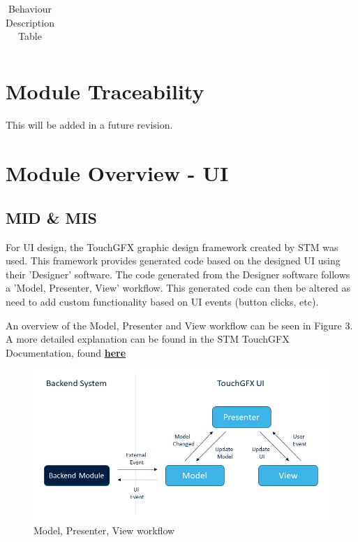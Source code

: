 \documentclass[12pt,titlepage]{article}
\begin{document}
\begin{table}[htb!]
\begin{center}
\begin{adjustbox}{max width=.9\textwidth}
\begin{tabular}{|p{}|p{}|}
\end{tabular}
\end{adjustbox}
\end{center}
\caption{Behaviour Description Table}
\end{table}

\pagebreak

\section{Module Traceability}

This will be added in a future revision.

\section {Module Overview - UI}

\subsection{MID \& MIS}

For UI design, the TouchGFX graphic design framework created by STM was used. This framework provides generated code based on the designed UI using their 'Designer' software. The code generated from the Designer software follows a 'Model, Presenter, View' workflow. This generated code can then be altered as need to add custom functionality based on UI events (button clicks, etc).

An overview of the Model, Presenter and View workflow can be seen in Figure 3. A more detailed explanation can be found in the STM TouchGFX Documentation, found \textbf{\href{https://support.touchgfx.com/docs/development/ui-development/software-architecture/model-view-presenter-design-pattern/}{here}}

 \begin{figure}[!htbp]
  \centering
  \includegraphics[width=.7\linewidth]{MVP.png}
  \caption{Model, Presenter, View workflow}
\end{figure}
\end{document}
